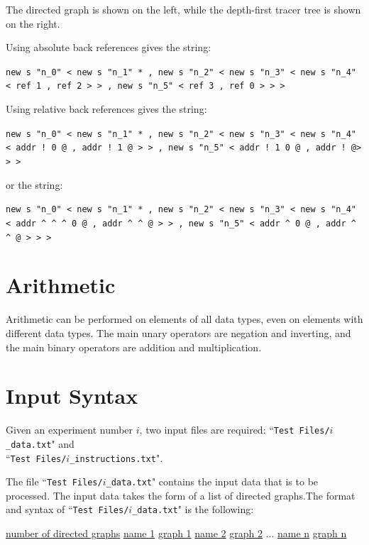\documentclass{article}
\begin{document}
The directed graph is shown on the left, while the depth-first tracer tree is shown on the right.

Using absolute back references gives the string:

\texttt{new s "n\_0" < new s "n\_1" * , new s "n\_2" < new s "n\_3" < new s "n\_4" < ref 1 , ref 2 > > , new s "n\_5" < ref 3 , ref 0 > > >}

Using relative back references gives the string: 

\texttt{new s "n\_0" < new s "n\_1" * , new s "n\_2" < new s "n\_3" < new s "n\_4" < addr !~0 @ , addr !~1 @ > > , new s "n\_5" < addr !~1 0 @ , addr !~@> > >}

or the string: 

\texttt{new s "n\_0" < new s "n\_1" * , new s "n\_2" < new s "n\_3" < new s "n\_4" < addr \^{} \^{} \^{} 0 @ , addr \^{} \^{} @ > > , new s "n\_5" < addr \^{} 0 @ , addr \^{} \^{} @ > > >}



\section{Arithmetic}

Arithmetic can be performed on elements of all data types, even on elements with different data types. The main unary operators are negation and inverting, and the main binary operators are addition and multiplication. 



\section{Input Syntax}

Given an experiment number \(i\), two input files are required: ``\texttt{Test Files/\(i\)\_data.txt}" and \\ ``\texttt{Test Files/\(i\)\_instructions.txt}". 

The file ``\texttt{Test Files/\(i\)\_data.txt}" contains the input data that is to be processed. The input data takes the form of a list of directed graphs.The format and syntax of ``\texttt{Test Files/\(i\)\_data.txt}" is the following: 

\vspace{5mm}
\begin{framed}
\begin{algorithmic}
\STATE \underline{number of directed graphs}
\STATE 
\STATE \underline{name 1} \underline{graph 1} 
\STATE
\STATE \underline{name 2} \underline{graph 2} 
\STATE
\STATE ...
\STATE
\STATE \underline{name n} \underline{graph n} 
\end{algorithmic}
\end{framed}
\vspace{5mm}
\end{document}
